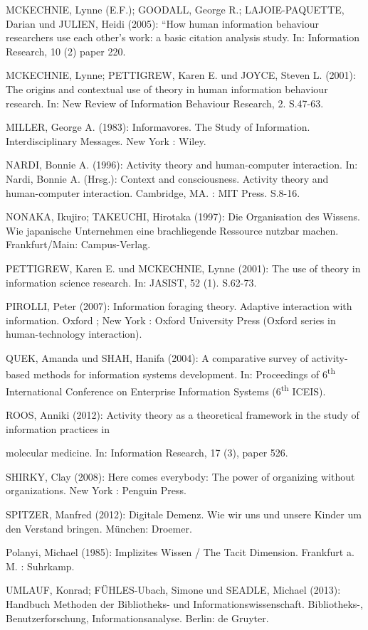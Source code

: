 \documentclass[a4paper,
fontsize=11pt,
oneside,
numbers=noperiodatend,
parskip=half-,
bibliography=totoc,
final
]{scrartcl}
\begin{document}
MCKECHNIE, Lynne (E.F.); GOODALL, George R.; LAJOIE-PAQUETTE, Darian und
JULIEN, Heidi (2005): ``How human information behaviour researchers use
each other's work: a basic citation analysis study. In: Information
Research, 10 (2) paper 220.

MCKECHNIE, Lynne; PETTIGREW, Karen E. und JOYCE, Steven L. (2001): The
origins and contextual use of theory in human information behaviour
research. In: New Review of Information Behaviour Research, 2. S.47-63.

MILLER, George A. (1983): Informavores. The Study of Information.
Interdisciplinary Messages. New York : Wiley.

NARDI, Bonnie A. (1996): Activity theory and human-computer interaction.
In: Nardi, Bonnie A. (Hrsg.): Context and consciousness. Activity theory
and human-computer interaction. Cambridge, MA. : MIT Press. S.8-16.

NONAKA, Ikujiro; TAKEUCHI, Hirotaka (1997): Die Organisation des
Wissens. Wie japanische Unternehmen eine brachliegende Ressource nutzbar
machen. Frankfurt/Main: Campus-Verlag.

PETTIGREW, Karen E. und MCKECHNIE, Lynne (2001): The use of theory in
information science research. In: JASIST, 52 (1). S.62-73.

PIROLLI, Peter (2007): Information foraging theory. Adaptive interaction
with information. Oxford ; New York : Oxford University Press (Oxford
series in human-technology interaction).

QUEK, Amanda und SHAH, Hanifa (2004): A comparative survey of
activity-based methods for information systems development. In:
Proceedings of 6\textsuperscript{th} International Conference on
Enterprise Information Systems (6\textsuperscript{th} ICEIS).

ROOS, Anniki (2012): Activity theory as a theoretical framework in the
study of information practices in

molecular medicine. In: Information Research, 17 (3), paper 526.

SHIRKY, Clay (2008): Here comes everybody: The power of organizing
without organizations. New York : Penguin Press.

SPITZER, Manfred (2012): Digitale Demenz. Wie wir uns und unsere Kinder
um den Verstand bringen. München: Droemer.

Polanyi, Michael (1985): Implizites Wissen / The Tacit Dimension.
Frankfurt a. M. : Suhrkamp.

UMLAUF, Konrad; FÜHLES-Ubach, Simone und SEADLE, Michael (2013):
Handbuch Methoden der Bibliotheks- und Informationswissenschaft.
Bibliotheks-, Benutzerforschung, Informationsanalyse. Berlin: de
Gruyter.
\end{document}
